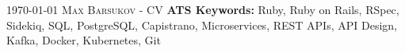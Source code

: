 
\makecvfooterwithkeywords
   {\textsc{\monthyeardate\today}}
   {\textsc{Max Barsukov - CV}}
   {\thepage}
   {\textbf{ATS Keywords:} Ruby, Ruby on Rails, RSpec, Sidekiq, SQL, PostgreSQL, Capistrano,
                           Microservices, REST APIs, API Design, Kafka, Docker, Kubernetes, Git}
